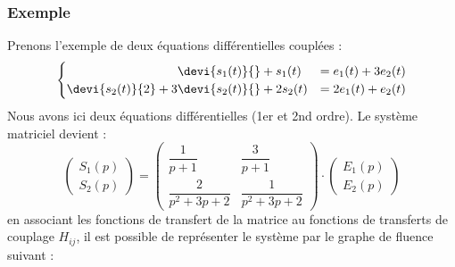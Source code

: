 \subsubsection*{Exemple}
Prenons l'exemple de deux équations différentielles couplées :
\[
\begin{cases}
\hphantom{\devi{s_2(t)}{2}+3}\devi{s_1(t)}{}+ s_1(t)  &=  e_1(t) + 3e_2(t) \\
          \devi{s_2(t)}{2}+3 \devi{s_2(t)}{}+ 2s_2(t) &= 2e_1(t) +  e_2(t)
\end{cases}
\]
Nous avons ici deux équations différentielles (1er et 2nd ordre).
Le système matriciel devient :
\[
    \begin{pmatrix} 
        S_1(p)\\
        S_2(p)
    \end{pmatrix}=
    \begin{pmatrix} 
    \dfrac{1}{p+1}      & \dfrac{3}{p+1} \\[2em] 
    \dfrac{2}{p^2+3p+2} & \dfrac{1}{p^2+3p+2} 
    \end{pmatrix}\cdot
    \begin{pmatrix} 
        E_1(p)\\
        E_2(p)
    \end{pmatrix}
\]
en associant les fonctions de transfert de la matrice au fonctions de transferts
de couplage $H_{ij}$, il est possible de représenter le système par le graphe 
de fluence suivant :
\begin{center}
    
\end{center}
\clearpage
\newcommand{\bdx}{\boldsymbol{x}}
\newcommand{\bds}{\boldsymbol{s}}
\newcommand{\bde}{\boldsymbol{e}}
